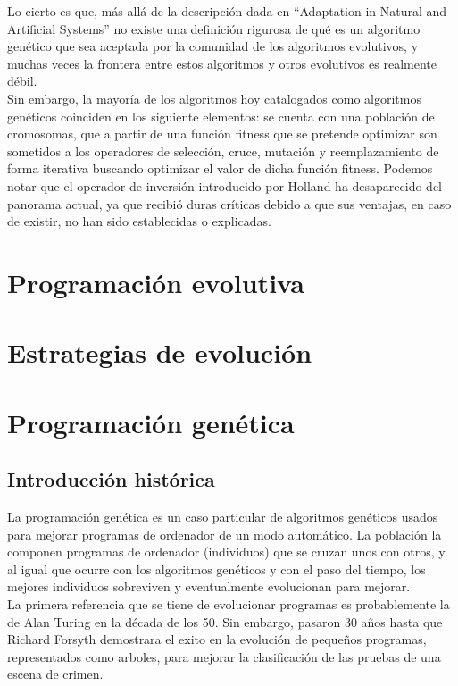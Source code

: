 \documentclass[12pt]{article} \usepackage[utf8x]{inputenc}
\begin{document}
Lo cierto es que, más allá de la descripción dada en ``Adaptation in Natural and Artificial Systems''
no existe una definición rigurosa de qué es un algoritmo genético que sea aceptada por la comunidad de los 
algoritmos evolutivos, y muchas veces la frontera entre estos algoritmos y otros evolutivos es
realmente débil. \\

Sin embargo, la mayoría de los algoritmos hoy catalogados como algoritmos genéticos coinciden en los 
siguiente elementos: se cuenta con una población de cromosomas, que a partir de una función fitness
que se pretende optimizar son sometidos a los operadores de selección, cruce, mutación y reemplazamiento
de forma iterativa buscando optimizar el valor de dicha función fitness.
 Podemos notar que el operador de inversión introducido por Holland ha desaparecido 
del panorama actual, ya que recibió duras críticas debido a que sus ventajas, en caso de existir, no han 
sido establecidas o explicadas.\\


\section{Programación evolutiva}

\section{Estrategias de evolución}

\section{Programación genética}


\subsection{Introducción histórica} 

La programación genética es un caso particular de algoritmos genéticos usados para mejorar programas de ordenador de un modo automático. La población la componen programas de  ordenador (individuos) que se cruzan unos con otros, y al igual que ocurre con los algoritmos genéticos y con el paso del tiempo, los mejores individuos sobreviven y eventualmente evolucionan para mejorar. \\

La primera referencia que se tiene de evolucionar programas es probablemente la de Alan Turing en la década de los 50. Sin embargo, pasaron 30 años hasta que Richard Forsyth demostrara el exito en la evolución de pequeños programas, representados como arboles, para mejorar la clasificación de las pruebas de una escena de crimen.\\
\end{document}
